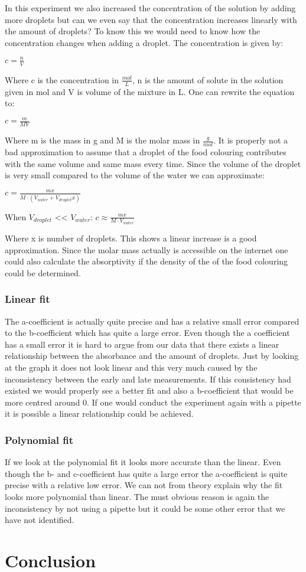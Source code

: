 \documentclass[working, oneside]{inputs/tuftebook}
\begin{document}
In this experiment we also increased the concentration of the solution by adding more droplets but can we even say that the concentration increases linearly with the amount of droplets? To know this we would need to know how the concentration changes when adding a droplet. The concentration is given by:
\begin{center}
$c = \frac{n}{V}$
\end{center}
Where c is the concentration in $\frac{mol}{L}$, n is the amount of solute in the solution given in mol and V is volume of the mixture in L. One can rewrite the equation to:
\begin{center}
$c = \frac{m}{MV}$
\end{center}
Where m is the mass in g and M is the molar mass in $\frac{g}{mol}$. It is properly not a bad approximation to assume that a droplet of the food colouring contributes with the same volume and same mass every time. Since the volume of the droplet is very small compared to the volume of the water we can approximate:
\begin{center}
$c=\frac{mx}{M\cdot(V_{water}+V_{droplet}x)}$
\smallskip

When $V_{droplet}$ << $V_{water}$: \:  $ c\approx \frac{mx}{M\cdot V_{water}}$
\end{center}

Where x is number of droplets. This shows a linear increase is a good approximation. Since the molar mass actually is accessible on the internet one could also calculate the absorptivity if the density of the of the food colouring could be determined. \\

\subsubsection*{Linear fit}
The a-coefficient is actually quite precise and has a relative small error compared to the b-coefficient which has quite a large error. Even though the a coefficient has a small error it is hard to argue from our data that there exists a linear relationship between the absorbance and the amount of droplets. Just by looking at the graph it does not look linear and this very much caused by the inconsistency between the early and late measurements. If this consistency had existed we would properly see a better fit and also a b-coefficient that would be more centred around 0. If one would conduct the experiment again with a pipette it is possible a linear relationship could be achieved.
\subsubsection*{Polynomial fit}
If we look at the polynomial fit it looks more accurate than the linear. Even though the b- and c-coefficient has quite a large error the a-coefficient is quite precise with a relative low error. We can not from theory explain why the fit looks more polynomial than linear. The must obvious reason is again the inconsistency by not using a pipette but it could be some other error that we have not identified.
\section*{Conclusion}
\end{document}
